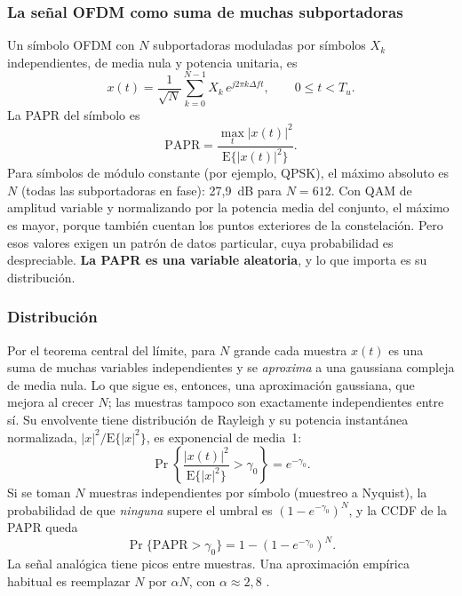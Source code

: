 \subsubsection{La señal OFDM como suma de muchas subportadoras}
Un símbolo OFDM con $N$ subportadoras moduladas por símbolos $X_k$ independientes, de media nula y potencia unitaria, es
\begin{equation}
x(t) = \frac{1}{\sqrt{N}}\sum_{k=0}^{N-1} X_k\, e^{j2\pi k\Delta f t},\qquad 0\le t<T_u.
\label{eq:ofdm}
\end{equation}
La PAPR del símbolo es
\begin{equation}
\text{PAPR} = \frac{\max_{t}|x(t)|^2}{\mathrm{E}\{|x(t)|^2\}}.
\label{eq:papr}
\end{equation}
Para símbolos de módulo constante (por ejemplo, QPSK), el máximo absoluto es $N$ (todas las subportadoras en fase): 27,9~dB para $N=612$. Con QAM de amplitud variable y normalizando por la potencia media del conjunto, el máximo es mayor, porque también cuentan los puntos exteriores de la constelación. Pero esos valores exigen un patrón de datos particular, cuya probabilidad es despreciable. \textbf{La PAPR es una variable aleatoria}, y lo que importa es su distribución.

\subsubsection{Distribución}
Por el teorema central del límite, para $N$ grande cada muestra $x(t)$ es una suma de muchas variables independientes y se \emph{aproxima} a una gaussiana compleja de media nula. Lo que sigue es, entonces, una aproximación gaussiana, que mejora al crecer $N$; las muestras tampoco son exactamente independientes entre sí. Su envolvente tiene distribución de Rayleigh y su potencia instantánea normalizada, $|x|^2/\mathrm{E}\{|x|^2\}$, es exponencial de media~1:
\begin{equation}
\Pr\left\{\frac{|x(t)|^2}{\mathrm{E}\{|x|^2\}} > \gamma_0\right\} = e^{-\gamma_0}.
\end{equation}
Si se toman $N$ muestras independientes por símbolo (muestreo a Nyquist), la probabilidad de que \emph{ninguna} supere el umbral es $(1-e^{-\gamma_0})^N$, y la CCDF de la PAPR queda
\begin{equation}
\Pr\{\text{PAPR} > \gamma_0\} = 1 - \left(1 - e^{-\gamma_0}\right)^{N}.
\label{eq:ccdf}
\end{equation}
La señal analógica tiene picos entre muestras. Una aproximación empírica habitual es reemplazar $N$ por $\alpha N$, con $\alpha\approx 2{,}8$ \cite{vannee}.

